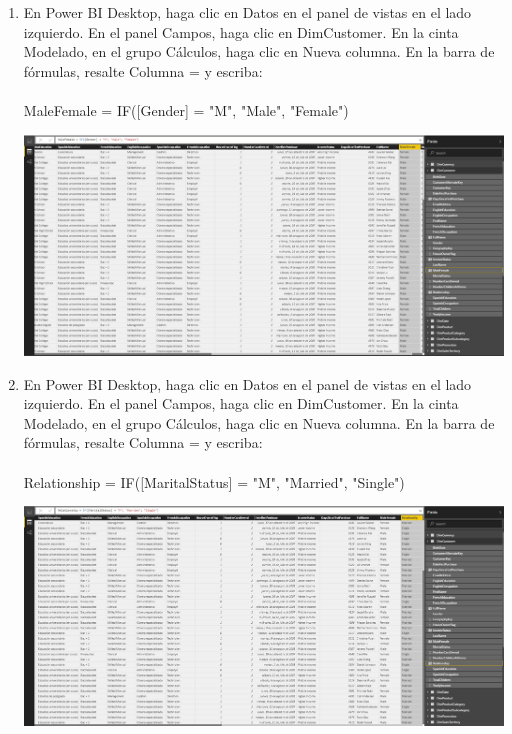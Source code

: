 \begin{enumerate}[1.]
	\item En Power BI Desktop, haga clic en Datos en el panel de vistas en el lado izquierdo. En el panel Campos, haga clic en DimCustomer.  En la cinta Modelado, en el grupo Cálculos, haga clic en Nueva columna. En la barra de fórmulas, resalte Columna = y escriba:
	\\
	\\MaleFemale = IF([Gender] = "M", "Male", "Female")\\
			 
	\begin{center}
	\includegraphics[width=17cm]{./Imagenes/34} 
	\end{center}

	\item En Power BI Desktop, haga clic en Datos en el panel de vistas en el lado izquierdo. En el panel Campos, haga clic en DimCustomer.  En la cinta Modelado, en el grupo Cálculos, haga clic en Nueva columna. En la barra de fórmulas, resalte Columna = y escriba:
	\\
	\\Relationship = IF([MaritalStatus] = "M", "Married", "Single")\\
			 
	\begin{center}
	\includegraphics[width=17cm]{./Imagenes/35} 
	\end{center}


\end{enumerate}
